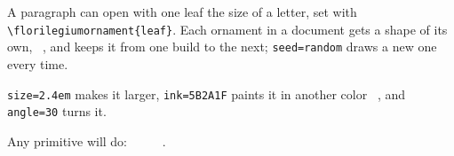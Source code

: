 \documentclass[11pt]{article}
\newcommand\code[1]{\texttt{\small #1}}
\begin{document}
\enspace A paragraph can open with one leaf the size of a
letter, set with \code{\textbackslash florilegiumornament\{leaf\}}. Each ornament in a
document gets a shape of its own,
\,\,\,,
and keeps it from one build to the next; \code{seed=random} draws a new one every time.

\enspace\code{size=2.4em} makes it larger, \code{ink=5B2A1F} paints it in
another color \,\,\,,
and \code{angle=30} turns it.

Any primitive will do:
\,\,\,\,%
\,\,\,\,%
\,\,\,.

\begin{center}
\qquad{}\qquad
{}\qquad{}
\end{center}
\end{document}
